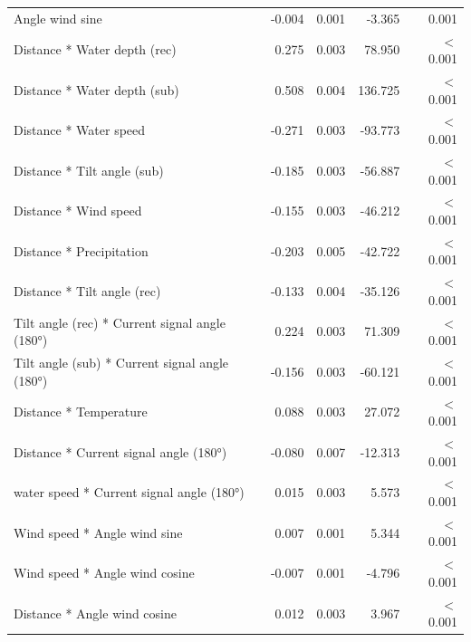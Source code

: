 \documentclass[doublespacing,linenumbers]{bmcart}
\begin{document}
\begin{backmatter}
\begin{table}[]
\begin{tabular}{lrrrr}
Angle wind sine                                  & -0.004                  & 0.001                  & -3.365                      & 0.001    \\
Distance * Water depth (rec)                     & 0.275                   & 0.003                  & 78.950                       & $<$0.001 \\
Distance * Water depth (sub)                     & 0.508                   & 0.004                  & 136.725                     & $<$0.001 \\
Distance * Water speed                           & -0.271                  & 0.003                  & -93.773                     & $<$0.001 \\
Distance * Tilt angle (sub)                      & -0.185                  & 0.003                  & -56.887                     & $<$0.001 \\
Distance * Wind speed                            & -0.155                  & 0.003                  & -46.212                     & $<$0.001 \\
Distance * Precipitation                         & -0.203                  & 0.005                  & -42.722                     & $<$0.001 \\
Distance * Tilt angle (rec)                      & -0.133                  & 0.004                  & -35.126                     & $<$0.001 \\
Tilt angle (rec) * Current signal angle   (180°) & 0.224                   & 0.003                  & 71.309                      & $<$0.001 \\
Tilt angle (sub) * Current signal angle   (180°) & -0.156                  & 0.003                  & -60.121                     & $<$0.001 \\
Distance * Temperature                              & 0.088                   & 0.003                  & 27.072                      & $<$0.001 \\
Distance * Current signal angle (180°)           & -0.080                   & 0.007                  & -12.313                     & $<$0.001 \\
water speed * Current signal angle   (180°)      & 0.015                   & 0.003                  & 5.573                       & $<$0.001 \\
Wind speed * Angle wind sine                     & 0.007                   & 0.001                  & 5.344                       & $<$0.001 \\
Wind speed * Angle wind cosine                   & -0.007                  & 0.001                  & -4.796                      & $<$0.001 \\
Distance * Angle wind cosine                     & 0.012                   & 0.003                  & 3.967                       & $<$0.001 \\ \hline
\end{tabular}
\label{tab:GLM_bin}
\end{table}


\end{backmatter}
\end{document}
